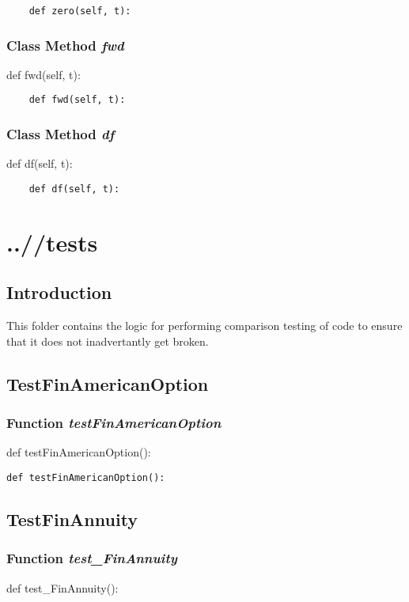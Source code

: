 \documentclass[twoside,11pt]{book}
\begin{document}
\begin{lstlisting}
    def zero(self, t):
\end{lstlisting}

\subsection{Class Method {\it fwd}}
def fwd(self, t):

\begin{lstlisting}
    def fwd(self, t):
\end{lstlisting}

\subsection{Class Method {\it df}}
def df(self, t):

\begin{lstlisting}
    def df(self, t):
\end{lstlisting}


\chapter{..//tests}
\section{Introduction}
This folder contains the logic for performing comparison testing of code to ensure that it does not inadvertantly get broken. 

\newpage
\section{TestFinAmericanOption}

\subsection{Function {\it testFinAmericanOption}}
def testFinAmericanOption():

\begin{lstlisting}
def testFinAmericanOption():
\end{lstlisting}


\newpage
\section{TestFinAnnuity}

\subsection{Function {\it test\_FinAnnuity}}
def test\_FinAnnuity():
\end{document}
